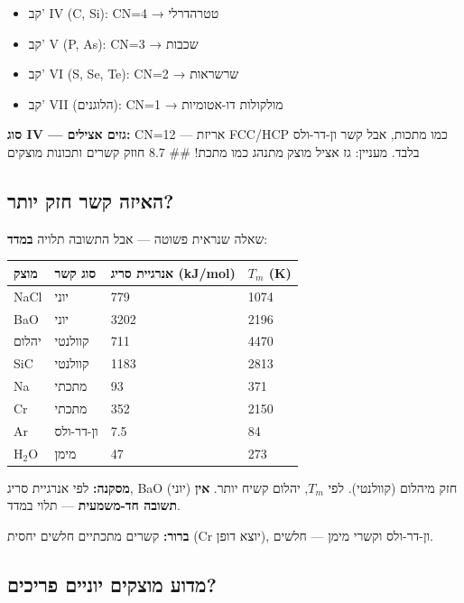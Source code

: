 \documentclass[
  hebrew,
  letterpaper,
  DIV=11,
  numbers=noendperiod]{scrreprt}
\newcounter{none} %
\providecommand{\tightlist}{%
  \setlength{\itemsep}{0pt}\setlength{\parskip}{0pt}}
\begin{document}
\begin{itemize}
\tightlist
\item
  קב' IV (C, Si): CN=4 → טטרהדרלי
\item
  קב' V (P, As): CN=3 → שכבות
\item
  קב' VI (S, Se, Te): CN=2 → שרשראות
\item
  קב' VII (הלוגנים): CN=1 → מולקולות דו-אטומיות
\end{itemize}

\textbf{סוג IV --- גזים אצילים:} CN=12 --- אריזת FCC/HCP כמו מתכות, אבל
קשר ון-דר-ולס בלבד. מעניין: גז אציל מוצק מתנהג כמו מתכת! \#\# 8.7 חוזק
קשרים ותכונות מוצקים

\subsection{האיזה קשר חזק
יותר?}\label{ux5d4ux5d0ux5d9ux5d6ux5d4-ux5e7ux5e9ux5e8-ux5d7ux5d6ux5e7-ux5d9ux5d5ux5eaux5e8}

שאלה שנראית פשוטה --- אבל התשובה תלויה \textbf{במדד}:

{\def\LTcaptype{none} %
\begin{longtable}[]{@{}llll@{}}
\toprule\noalign{}
מוצק & סוג קשר & אנרגיית סריג (kJ/mol) & \(T_m\) (K) \\
\midrule\noalign{}
\endhead
\bottomrule\noalign{}
\endlastfoot
NaCl & יוני & 779 & 1074 \\
BaO & יוני & 3202 & 2196 \\
יהלום & קוולנטי & 711 & 4470 \\
SiC & קוולנטי & 1183 & 2813 \\
Na & מתכתי & 93 & 371 \\
Cr & מתכתי & 352 & 2150 \\
Ar & ון-דר-ולס & 7.5 & 84 \\
\(\text{H}_2\text{O}\) & מימן & 47 & 273 \\
\end{longtable}
}

\textbf{מסקנה:} לפי אנרגיית סריג, BaO (יוני) חזק מיהלום (קוולנטי). לפי
\(T_m\), יהלום קשיח יותר. \textbf{אין תשובה חד-משמעית} --- תלוי במדד.

\textbf{ברור:} קשרים מתכתיים חלשים יחסית (Cr יוצא דופן), ון-דר-ולס וקשרי
מימן --- חלשים.

\subsection{מדוע מוצקים יוניים
פריכים?}\label{ux5deux5d3ux5d5ux5e2-ux5deux5d5ux5e6ux5e7ux5d9ux5dd-ux5d9ux5d5ux5e0ux5d9ux5d9ux5dd-ux5e4ux5e8ux5d9ux5dbux5d9ux5dd}
\end{document}
